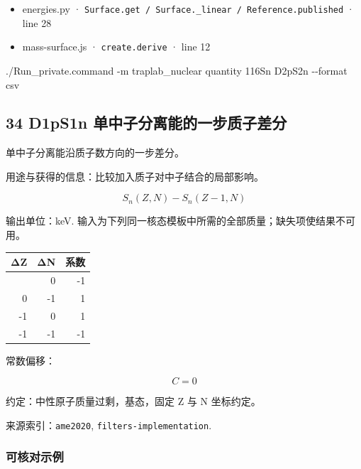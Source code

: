 \documentclass[
  11pt,
  letterpaper,
]{article}
\newenvironment{Shaded}{}{}
\newcommand{\AttributeTok}[1]{\textcolor[rgb]{0.49,0.56,0.16}{#1}}
\newcommand{\ExtensionTok}[1]{#1}
\newcommand{\NormalTok}[1]{#1}
\providecommand{\tightlist}{%
  \setlength{\itemsep}{0pt}\setlength{\parskip}{0pt}}
\begin{document}
\begin{itemize}
\tightlist
\item
  energies.py ·
  \texttt{Surface.get\ /\ Surface.\_linear\ /\ Reference.published} ·
  line 28
\item
  mass-surface.js · \texttt{create.derive} · line 12
\end{itemize}

\begin{Shaded}
\begin{Highlighting}[]
\ExtensionTok{./Run\_private.command} \AttributeTok{{-}m}\NormalTok{ traplab\_nuclear quantity 116Sn D2pS2n }\AttributeTok{{-}{-}format}\NormalTok{ csv}
\end{Highlighting}
\end{Shaded}

\subsection{34 D1pS1n
单中子分离能的一步质子差分}\label{d1ps1n-ux5355ux4e2dux5b50ux5206ux79bbux80fdux7684ux4e00ux6b65ux8d28ux5b50ux5deeux5206}

单中子分离能沿质子数方向的一步差分。

用途与获得的信息：比较加入质子对中子结合的局部影响。

\[
S_n(Z,N)-S_n(Z-1,N)
\]

输出单位：keV.
输入为下列同一核态模板中所需的全部质量；缺失项使结果不可用。

\begin{longtable}[]{@{}rrr@{}}
\toprule\noalign{}
ΔZ & ΔN & 系数 \\
\midrule\noalign{}
\endhead
\bottomrule\noalign{}
\endlastfoot
0 & 0 & -1 \\
0 & -1 & 1 \\
-1 & 0 & 1 \\
-1 & -1 & -1 \\
\end{longtable}

常数偏移：

\[
C=0
\]

约定：中性原子质量过剩，基态，固定 Z 与 N 坐标约定。

来源索引：\texttt{ame2020}, \texttt{filters-implementation}.

\subsubsection{可核对示例}\label{ux53efux6838ux5bf9ux793aux4f8b-33}
\end{document}
